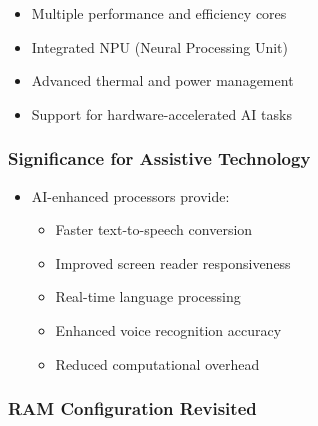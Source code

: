 \begin{enumerate}
\begin{itemize}
		            \begin{itemize}
			            \item Multiple performance and efficiency cores \supercite{IntelHybridArchitecture}
			            \item Integrated NPU (Neural Processing Unit) \supercite{IntelNPU, AMDAIProcessing}
			            \item Advanced thermal and power management \supercite{IntelThermalManagement}
			            \item Support for hardware-accelerated AI tasks \supercite{IntelAIAcceleration, AMDAIAcceleration}
		            \end{itemize}

	      \end{itemize}

\end{enumerate}


\subsubsection{Significance for Assistive Technology}

\begin{itemize}
	\item AI-enhanced processors provide:

	      \begin{itemize}
		      \item Faster text-to-speech conversion \supercite{AIinAccessibility}
		      \item Improved screen reader responsiveness \supercite{AIinAccessibility}
		      \item Real-time language processing \supercite{AIinAccessibility}
		      \item Enhanced voice recognition accuracy \supercite{AIinAccessibility}
		      \item Reduced computational overhead \supercite{AIinAccessibility}
	      \end{itemize}

\end{itemize}


\subsubsection{RAM Configuration Revisited}

